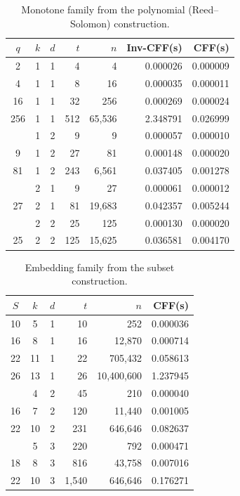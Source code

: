 \begin{table}[htbp]
  \centering
  \begin{tabular}{cccrrrr}
  \toprule
  $q$ & $k$ & $d$ & $t$ & $n$ & \textbf{Inv-CFF(s)} & \textbf{CFF(s)} \\
  \midrule
  2 & 1 & 1 & 4 & 4 & 0.000026 & 0.000009 \\
  4 & 1 & 1 & 8 & 16 & 0.000035 & 0.000011 \\
  16 & 1 & 1 & 32 & 256 & 0.000269 & 0.000024 \\
  256 & 1 & 1 & 512 & 65{,}536 & 2.348791 & 0.026999 \\
  \addlinespace
  3 & 1 & 2 & 9 & 9 & 0.000057 & 0.000010 \\
  9 & 1 & 2 & 27 & 81 & 0.000148 & 0.000020 \\
  81 & 1 & 2 & 243 & 6{,}561 & 0.037405 & 0.001278 \\
  \addlinespace
  3 & 2 & 1 & 9 & 27 & 0.000061 & 0.000012 \\
  27 & 2 & 1 & 81 & 19{,}683 & 0.042357 & 0.005244 \\
  \addlinespace
  5 & 2 & 2 & 25 & 125 & 0.000130 & 0.000020 \\
  25 & 2 & 2 & 125 & 15{,}625 & 0.036581 & 0.004170 \\
  \bottomrule
  \end{tabular}
  \caption{Monotone family from the polynomial (Reed--Solomon) construction.}
  \label{tab:rs-monotone}
\end{table}

\begin{table}[htbp]
  \centering
  \begin{tabular}{cccrrr}
  \toprule
  $S$ & $k$ & $d$ & $t$ & $n$ & \textbf{CFF(s)} \\
  \midrule
  10 & 5 & 1 & 10 & 252 & 0.000036 \\
  16 & 8 & 1 & 16 & 12{,}870 & 0.000714 \\
  22 & 11 & 1 & 22 & 705{,}432 & 0.058613 \\
  26 & 13 & 1 & 26 & 10{,}400{,}600 & 1.237945 \\
  \addlinespace
  10 & 4 & 2 & 45 & 210 & 0.000040 \\
  16 & 7 & 2 & 120 & 11{,}440 & 0.001005 \\
  22 & 10 & 2 & 231 & 646{,}646 & 0.082637 \\
  \addlinespace
  12 & 5 & 3 & 220 & 792 & 0.000471 \\
  18 & 8 & 3 & 816 & 43{,}758 & 0.007016 \\
  22 & 10 & 3 & 1{,}540 & 646{,}646 & 0.176271 \\
  \bottomrule
  \end{tabular}
  \caption{Embedding family from the subset construction.}
  \label{tab:subset-embedding}
\end{table}

